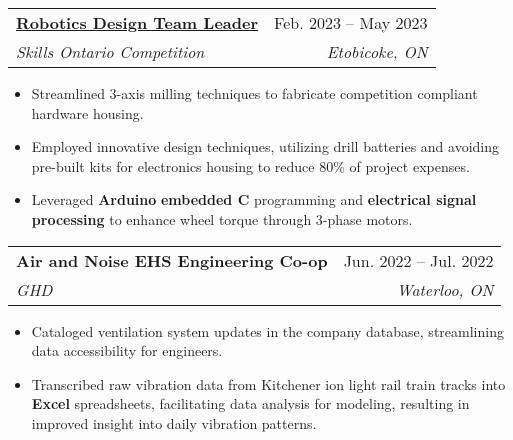 \documentclass[letterpaper]{article}
\makeatletter
\newcommand{\resumeItem}[1]{
  \item\small{
    {#1 \vspace{-2pt}}
  }
}
\newcommand{\resumeSubheading}[4]{
  \vspace{-2pt}\item
    \begin{tabular*}{0.97\textwidth}[t]{l@{\extracolsep{\fill}}r}
      \textbf{#1} & #2 \\
      \textit{\small#3} & \textit{\small #4} \\
    \end{tabular*}\vspace{-7pt}
}
\newcommand{\resumeItemListStart}{\begin{itemize}}
\newcommand{\resumeItemListEnd}{\end{itemize}\vspace{-5pt}}
\makeatother
\begin{document}
    \resumeSubheading
      {\underline{\href{https://www.gavintranquilino.com/hockey-robot.html}{Robotics Design Team Leader}}}{Feb. 2023 -- May 2023}
      {Skills Ontario Competition}{Etobicoke, ON}
      \resumeItemListStart
        \resumeItem{Streamlined 3-axis milling techniques to fabricate competition compliant hardware housing.}
        \resumeItem{Employed innovative design techniques, utilizing drill batteries and avoiding pre-built kits for electronics housing to reduce 80\% of project expenses.}
        \resumeItem{Leveraged \textbf{Arduino} \textbf{embedded C} programming and \textbf{electrical signal processing} to enhance wheel torque through 3-phase motors.}
    \resumeItemListEnd

    \resumeSubheading
      {Air and Noise EHS Engineering Co-op}{Jun. 2022 -- Jul. 2022}
      {GHD}{Waterloo, ON}
      \resumeItemListStart
        \resumeItem{Cataloged ventilation system updates in the company database, streamlining data accessibility for engineers.}
        \resumeItem{Transcribed raw vibration data from Kitchener ion light rail train tracks into \textbf{Excel} spreadsheets, facilitating data analysis for modeling, resulting in improved insight into daily vibration patterns.}
      \resumeItemListEnd

\end{document}
